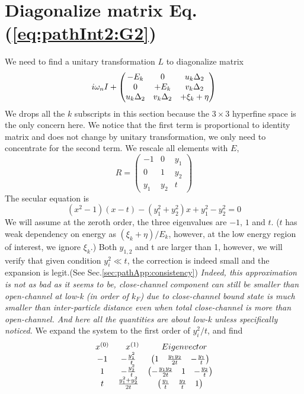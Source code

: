 

\section{Diagonalize matrix Eq. (\ref{eq:pathInt2:G2})\label{sec:diagonalize}}
We need to find a unitary transformation $L$ to diagonalize matrix 
\begin{equation*}
i\omega_{n}I+\begin{pmatrix}-E_k&0&u _k\Delta_2\\0&+E_k&v_k\Delta_2\\u_k\Delta_2&v_k\Delta_2&+\xi_k+\eta\end{pmatrix}
\end{equation*}
We drops all the $k$ subscripts in this section because the $3\times3$ hyperfine space is the only concern here.  We notice that the first term is proportional to identity matrix and does not change by unitary transformation, we only need to concentrate for the second term.  We rescale all elements with $E$, 
\begin{equation*}
R=
\begin{pmatrix}
-1&0&y_1\\
0&1&y_2\\
y_1&y_2&t
\end{pmatrix}
\end{equation*}
The secular equation is 
\begin{equation}\label{eq:pahtApp:secular}
(x^{2}-1)(x-t)-(y_{1}^{2}+y_{2}^{2})x+y_{1}^{2}-y_{2}^{2}=0
\end{equation}
We will assume at the zeroth order, the three eigenvalues are $-1$, $1$ and $t$.  ($t$ has weak dependency on energy as $(\xi_{k}+\eta)/E_{k}$, however, at the low energy region of interest, we ignore $\xi_{k}$.) Both $y_{1,2}$ and t are larger than 1, however, we will verify that given condition $y_{i}^{2}\ll{t}$, the correction is indeed small and the expansion is legit.(See Sec.\ref{sec:pathApp:consistency})  \emph{Indeed, this approximation is not as bad as it seems to be, close-channel component can still be smaller than open-channel at low-k (in order of $k_{F}$)  due to close-channel bound state is much smaller than inter-particle distance even when total close-channel is more than open-channel.  And here all the quantities are about low-k unless specifically noticed.} 
We expand the system to the first order of $y_{i}^{2}/{t}$, and find
\begin{equation}
\begin{array}{ccc}
x^{(0)}&\quad{}x^{(1)}&\quad{}Eigenvector\nonumber\\
-1&-\frac{y_{1}^{2}}{t}&\begin{pmatrix}1&\frac{y_{1}y_{2}}{2t}&-\frac{y_{1}}{t}\end{pmatrix}\\
1&-\frac{y_{2}^{2}}{t}&\begin{pmatrix}-\frac{y_{1}y_{2}}{2t}&1&-\frac{y_{2}}{t}\end{pmatrix}\\
t&\frac{y_{1}^{2}+y_{2}^{2}}{2t}&\begin{pmatrix}\frac{y_{1}}{t}&\frac{y_{2}}{t}&1\end{pmatrix}
\end{array}
\end{equation}
